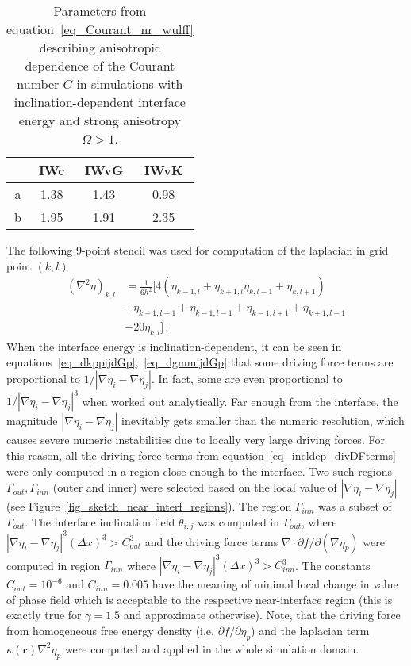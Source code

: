 \begin{table}[]
	\centering
	\caption[Parameters from equation~\eqref{eq_Courant_nr_wulff} describing anisotropic dependence of the Courant number $C$]{Parameters from equation~\eqref{eq_Courant_nr_wulff} describing anisotropic dependence of the Courant number $C$ in simulations with inclination-dependent interface energy and strong anisotropy $\Omega>1$.}
	\label{tab_Courant_nr_wulff}
	\begin{tabular}{c|c|c|c}
		& IWc & IWvG & IWvK \\ \hline
		a & 1.38 & 1.43 & 0.98\\
		b& 1.95 & 1.91 & 2.35
	\end{tabular}
\end{table}
The following 9-point stencil was used for computation of the laplacian in grid point $(k,l)$
\begin{equation}
	\begin{split}
		(\nabla^2\eta)_{k,l} &=  \frac{1}{6h^2}[4(\eta_{k-1,l}+ \eta_{k+1,l} \eta_{k,l-1}+ \eta_{k,l+1}) \\
		&+ \eta_{k+1,l+1} +\eta_{k-1,l-1}+\eta_{k-1,l+1}+\eta_{k+1,l-1} \\
		&-20\eta_{k,l}]  \,.
	\end{split}
\end{equation}
When the interface energy is inclination-dependent, it can be seen in equations~\eqref{eq_dkppijdGp},~\eqref{eq_dgmmijdGp} that some driving force terms are proportional to $1/|\nabla\eta_i-\nabla\eta_j|$. In fact, some are even proportional to $1/|\nabla\eta_i-\nabla\eta_j|^3$ when worked out analytically. Far enough from the interface, the magnitude $|\nabla\eta_i-\nabla\eta_j|$ inevitably gets smaller than the numeric resolution, which causes severe numeric instabilities due to locally very large driving forces. For this reason, all the driving force terms from equation~\eqref{eq_incldep_divDFterms} were only computed in a region close enough to the interface. Two such regions $\Gamma_{out},\Gamma_{inn}$ (outer and inner) were selected based on the local value of $|\nabla\eta_i-\nabla\eta_j|$ (see Figure~\ref{fig_sketch_near_interf_regions}). The region $\Gamma_{inn}$ was a subset of $\Gamma_{out}$. The interface inclination field $\theta_{i,j}$ was computed in $\Gamma_{out}$, where $|\nabla\eta_i-\nabla\eta_j|^3(\Delta x)^3>C_{out}^3$ and the driving force terms $\nabla\cdot\partial f/\partial(\nabla\eta_p)$ were computed in region $\Gamma_{inn}$ where $|\nabla\eta_i-\nabla\eta_j|^3(\Delta x)^3>C_{inn}^3$. The constants $C_{out}=10^{-6}$ and $C_{inn}=0.005$ have the meaning of minimal local change in value of phase field which is acceptable to the respective near-interface region (this is exactly true for $\gamma=1.5$ and approximate otherwise). Note, that the driving force from homogeneous free energy density (i.e. $\partial f/\partial \eta_p$) and the laplacian term $\kappa(\bm{r})\nabla^2\eta_p$ were computed and applied in the whole simulation domain.
